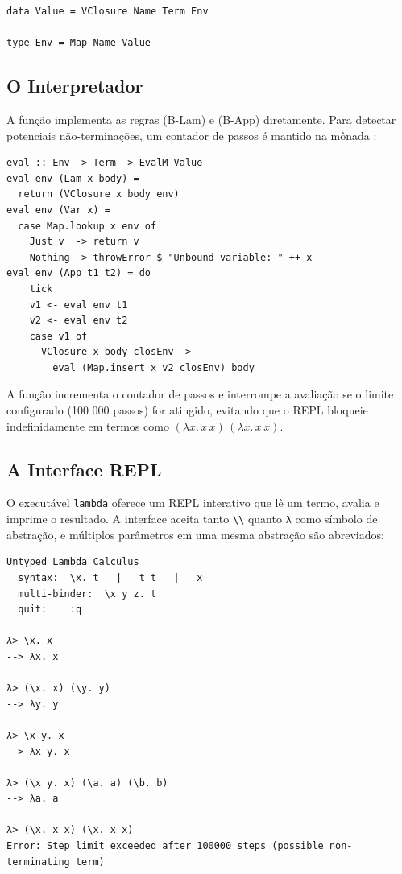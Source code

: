 \begin{verbatim}
data Value = VClosure Name Term Env

type Env = Map Name Value
\end{verbatim}

\subsection{O Interpretador}

A função  implementa as regras (B-Lam)
e (B-App) diretamente. Para detectar potenciais não-terminações, um
contador de passos é mantido na mônada :

\begin{verbatim}
eval :: Env -> Term -> EvalM Value
eval env (Lam x body) =
  return (VClosure x body env)
eval env (Var x) =
  case Map.lookup x env of
    Just v  -> return v
    Nothing -> throwError $ "Unbound variable: " ++ x
eval env (App t1 t2) = do
    tick
    v1 <- eval env t1
    v2 <- eval env t2
    case v1 of
      VClosure x body closEnv ->
        eval (Map.insert x v2 closEnv) body
\end{verbatim}

A função  incrementa o contador de
passos e interrompe a avaliação se o limite configurado (100 000
passos) for atingido, evitando que o REPL bloqueie indefinidamente em
termos como \((\lambda x.\, x\, x)\,(\lambda x.\, x\, x)\).

\subsection{A Interface REPL}

O executável \verb|lambda| oferece um REPL
interativo que lê um termo, avalia e imprime o resultado. A interface
aceita tanto \verb|\\| quanto
\verb|λ| como símbolo de abstração, e múltiplos
parâmetros em uma mesma abstração são abreviados:

\begin{verbatim}
Untyped Lambda Calculus
  syntax:  \x. t   |   t t   |   x
  multi-binder:  \x y z. t
  quit:    :q

λ> \x. x
--> λx. x

λ> (\x. x) (\y. y)
--> λy. y

λ> \x y. x
--> λx y. x

λ> (\x y. x) (\a. a) (\b. b)
--> λa. a

λ> (\x. x x) (\x. x x)
Error: Step limit exceeded after 100000 steps (possible non-terminating term)
\end{verbatim}

